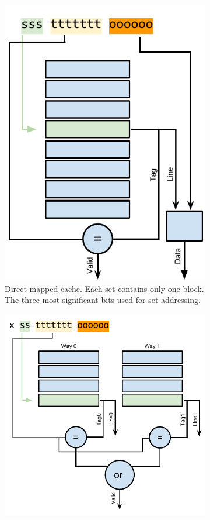 \begin{figure}
    \centering
    \begin{subfigure}[b]{0.45\textwidth}
        \centering
        \includegraphics[width=.7\textwidth]{figures/introduction/dircache_read}
        \caption{Direct mapped cache. Each set contains only one block. The three most significant bits used for set addressing.}
        \label{fig:introduction:cache:dir}
    \end{subfigure}\hfill%
    \begin{subfigure}[b]{0.45\textwidth}
        \centering
        \includegraphics[width=.8\textwidth]{figures/introduction/2waycache_read}

\end{subfigure}
\end{figure}
